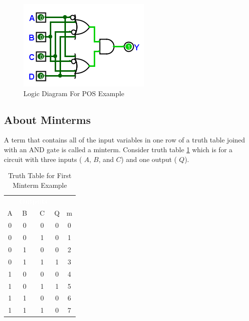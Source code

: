 \begin{figure}[H]
	\centering
	\includegraphics[width=\maxwidth{.95\linewidth}]{gfx/05_03}
	\caption{Logic Diagram For POS Example}
	\label{fig:05_03}
\end{figure}

\subsection{About Minterms}
\label{05:subsec:about_minterms}

A term that contains all of the input variables in one row of a truth table joined with an \textsf{AND} gate is called a minterm. Consider truth table \ref{05:tab:truth_table_for_first_minterm_example} which is for a circuit with three inputs ( $ A $,  $ B $, and  $ C $) and one output ( $ Q $).

\begin{table}[H]
  \sffamily
  \newcommand{\head}[1]{\textcolor{white}{\textbf{#1}}}    
  \begin{center}
    \begin{tabular}{ccc|cc} 
      \rowcolor{black!75}
      \multicolumn{3}{c}{\head{Inputs}} & \multicolumn{2}{c}{\head{Outputs}} \\
      A & B & C & Q & m\\
      \hline
      0 & 0 & 0 & 0 & 0 \\
      0 & 0 & 1 & 0 & 1 \\
      0 & 1 & 0 & 0 & 2 \\
      0 & 1 & 1 & 1 & 3 \\
      1 & 0 & 0 & 0 & 4 \\
      1 & 0 & 1 & 1 & 5 \\
      1 & 1 & 0 & 0 & 6 \\
      1 & 1 & 1 & 0 & 7 
    \end{tabular}
  \end{center}
  \caption{Truth Table for First Minterm Example}
  \label{05:tab:truth_table_for_first_minterm_example}
\end{table}

